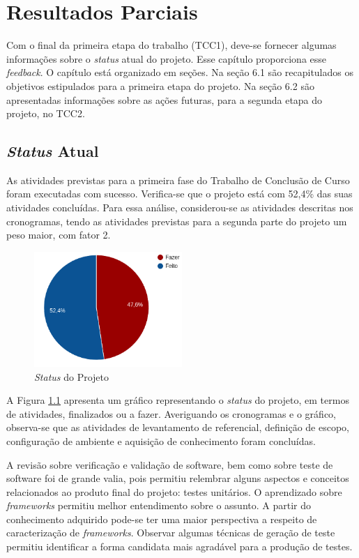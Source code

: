 \chapter[Resultados Parciais]{Resultados Parciais}
Com o final da primeira etapa do trabalho (TCC1), deve-se fornecer algumas informações sobre o \textit{status} atual do projeto. Esse capítulo proporciona esse \textit{feedback}. O capítulo está organizado em seções. Na seção 6.1 são recapitulados os objetivos estipulados para a primeira etapa do projeto. Na seção 6.2 são apresentadas informações sobre as ações futuras, para a segunda etapa do projeto, no TCC2.

\section{\textit{Status} Atual}
As atividades previstas para a primeira fase do Trabalho de Conclusão de Curso foram executadas com sucesso. Verifica-se que o projeto está com 52,4\%  das suas atividades concluídas. Para essa análise, considerou-se as atividades descritas nos cronogramas, tendo as atividades previstas para a segunda parte do projeto um peso maior, com fator 2.
\par
\begin{figure}[h]
\centering
  \includegraphics[width=0.5\textwidth]{figuras/pizzadobro.png}
  \caption{ \textit{Status} do Projeto}
  \label{fig:resultados}
\end{figure}
\par
\indent A Figura \ref{fig:resultados} apresenta um gráfico representando o \textit{status} do projeto, em termos de atividades, finalizados ou a fazer. Averiguando os cronogramas e o gráfico, observa-se que as atividades de levantamento de referencial, definição de escopo, configuração de ambiente e aquisição de conhecimento foram concluídas.
\par
\indent A revisão sobre verificação e validação de software, bem como sobre teste de software foi de grande valia, pois permitiu relembrar alguns aspectos e conceitos relacionados ao produto final do projeto: testes unitários. O aprendizado sobre \textit{frameworks} permitiu melhor entendimento sobre o assunto. A partir do conhecimento adquirido pode-se ter uma maior perspectiva a respeito de caracterização de \textit{frameworks}. Observar algumas técnicas de geração de teste permitiu identificar a forma candidata mais agradável para a produção de testes.
